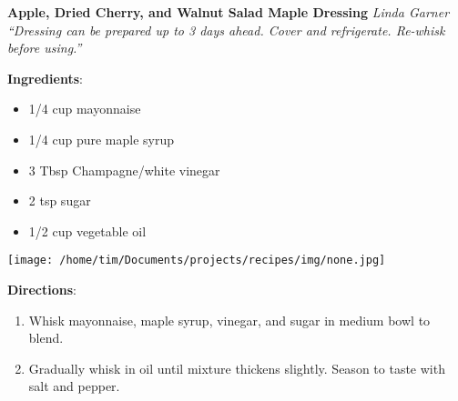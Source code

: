 \documentclass[11pt, twoside, openany]{book}
\begin{document}
\noindent\begin{minipage}[t]{\linewidth}%
{\Large\textbf{Apple, Dried Cherry, and Walnut Salad Maple Dressing}} \label{apple,-dried-cherry,-and-walnut-salad-maple-dressing}\hfill\textit{Linda Garner}\\
\textit{``Dressing can be prepared up to 3 days ahead. Cover and refrigerate. Re-whisk before using.''}\\
\noindent\begin{minipage}[t]{0.78\linewidth}%
\textbf{Ingredients}:\vspace{-3mm}
\begin{multicols}{2}
\begin{itemize}\setlength\itemsep{-1mm}
\item 1/4 cup mayonnaise
\item 1/4 cup pure maple syrup
\item 3 Tbsp Champagne/white vinegar
\item 2 tsp sugar
\item 1/2 cup vegetable oil
\end{itemize}
\end{multicols}
\end{minipage}
\noindent\begin{minipage}[t]{0.18\linewidth}
\centering \strut\vspace*{-\baselineskip}\newline
\texttt{[image: /home/tim/Documents/projects/recipes/img/none.jpg]}\\
\end{minipage}\vspace{3mm}
\textbf{Directions}:
\vspace{-3mm}\begin{enumerate}\setlength\itemsep{-1mm}
\item Whisk mayonnaise, maple syrup, vinegar, and sugar in medium bowl to blend.
\item Gradually whisk in oil until mixture thickens slightly. Season to taste with salt and pepper.
\end{enumerate}
\end{minipage}\vspace{8mm}
\end{document}
